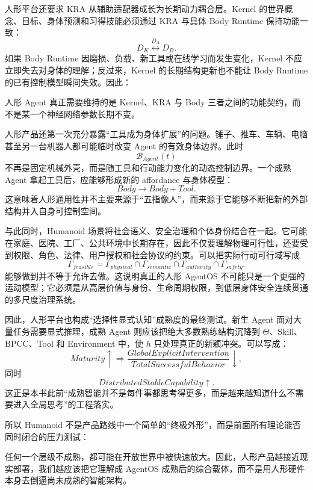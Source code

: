 人形平台还要求 KRA 从辅助适配器成长为长期动力耦合层。Kernel 的世界概念、目标、身体预测和习得技能必须通过 KRA 与具体 Body Runtime 保持功能一致：
\[
D_K
\overset{D_A}{\longleftrightarrow}
D_B.
\]
如果 Body Runtime 因磨损、负载、新工具或在线学习而发生变化，Kernel 不应立即失去对身体的理解；反过来，Kernel 的长期结构更新也不能让 Body Runtime 的已有控制模型瞬间失效。因此：
\begin{statementbox}
\centering
{}
\end{statementbox}
人形 Agent 真正需要维持的是 Kernel、KRA 与 Body 三者之间的功能契约，而不是某一个神经网络参数长期不变。

人形产品还第一次充分暴露“工具成为身体扩展”的问题。锤子、推车、车辆、电脑甚至另一台机器人都可能临时改变 Agent 的有效身体边界。此时
\[
\mathcal{B}_{Agent}(t)
\]
不再是固定机械外壳，而是随工具和行动能力变化的动态控制边界。一个成熟 Agent 拿起工具后，应能够形成新的 affordance 与身体模型：
\[
Body
\rightarrow
Body+Tool.
\]
这意味着人形通用性并不主要来源于“五指像人”，而来源于它能够不断把新的外部结构并入自身可控制空间。

与此同时，Humanoid 场景将社会语义、安全治理和个体身份结合在一起。它可能在家庭、医院、工厂、公共环境中长期存在，因此不仅要理解物理可行性，还要受到权限、角色、法律、用户授权和社会协议的约束。可以把实际行动可行域写成
\[
\Gamma_{feasible}
=
\Gamma_{physical}
\cap
\Gamma_{semantic}
\cap
\Gamma_{authority}
\cap
\Gamma_{safety}.
\]
能够做到并不等于允许去做。这说明真正的人形 AgentOS 不可能只是一个更强的运动模型；它必须是从高层价值与身份、生命周期权限，到低层身体安全连续贯通的多尺度治理系统。

因此，人形平台也构成“选择性显式认知”成熟度的最终测试。新生 Agent 面对大量任务需要显式推理，成熟 Agent 则应该把绝大多数熟练结构沉降到 $\Theta$、Skill、BPCC、Tool 和 Environment 中，使 $h$ 只处理真正的新颖冲突。可以写成：
\[
Maturity\uparrow
\Rightarrow
\frac{
GlobalExplicitIntervention
}{
TotalSuccessfulBehavior
}
\downarrow,
\]
同时
\[
DistributedStableCapability\uparrow.
\]
这正是本书此前“成熟智能并不是每件事都思考得更多，而是越来越知道什么不需要进入全局思考”的工程落实。

所以 Humanoid 不是产品路线中一个简单的“终极外形”，而是前面所有理论能否同时闭合的压力测试：
\begin{statementbox}
\centering
{}
\end{statementbox}
任何一个层级不成熟，都可能在开放世界中被快速放大。因此，人形产品越接近现实部署，我们越应该把它理解成 AgentOS 成熟后的综合载体，而不是用人形硬件本身去倒逼尚未成熟的智能架构。

